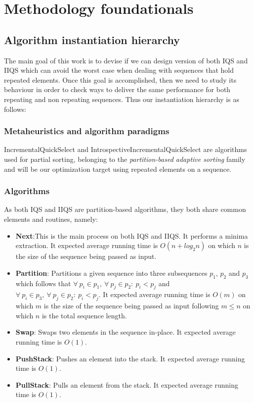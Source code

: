 \section{Methodology foundationals}
\label{SECTION:METHODOLOGY_FOUNDATIONALS}

\subsection{Algorithm instantiation hierarchy}
The main goal of this work is to devise if we can design version of both IQS and IIQS which can avoid the worst case when dealing with sequences that hold repeated elements. Once this goal is accomplished, then we need to study its behaviour in order to check ways to deliver the same performance for both repeating and non repeating sequences. Thus our instantiation hierarchy is as follows:

\subsubsection{Metaheuristics and algorithm paradigms}
IncrementalQuickSelect and IntrospectiveIncrementalQuickSelect are algorithms used for partial sorting, belonging to the \textit{partition-based adaptive sorting} family and will be our optimization target using repeated elements on a sequence.

\subsubsection{Algorithms}
As both IQS and IIQS are partition-based algorithms, they both share common elements and routines, namely:

\begin{itemize}
    \item \textbf{Next}:This is the main process on both IQS and IIQS. It performs a minima extraction. It expected average running time is $O(n + log_2{n})$ on which $n$ is the size of the sequence being passed as input.
    \item \textbf{Partition}: Partitions a given sequence into three subsequences $p_1$, $p_2$ and $p_3$ which follows that $\forall~p_i \in p_1,~\forall~p_j \in p_2:~ p_i < p_j$ and $\forall~p_i \in p_3,~\forall~p_j \in p_2:~p_i < p_j$. It expected average running time is $O(m)$ on which $m$ is the size of the sequence being passed as input following $m \leq n$ on which $n$ is the total sequence length.
    \item \textbf{Swap}: Swaps two elements in the sequence in-place. It expected average running time is $O(1)$.
    \item \textbf{PushStack}: Pushes an element into the stack. It expected average running time is $O(1)$.
    \item \textbf{PullStack}: Pulls an element from the stack. It expected average running time is $O(1)$.
\end{itemize}

